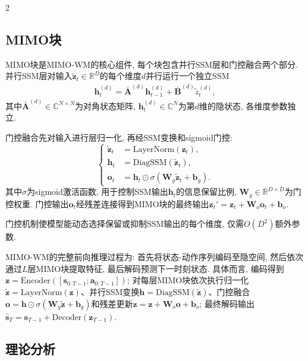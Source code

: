 \begin{multicols}{2}
\subsection{MIMO块}

\begin{Def}
MIMO块是MIMO-WM的核心组件, 每个块包含并行SSM层和门控融合两个部分.
并行SSM层对输入$\tilde{{\bm z}}_t \in \mathbb{R}^D$的每个维度$d$并行运行一个独立SSM
\begin{eqnarray}
{\bm h}_t^{(d)} = \bar{{\bm A}}^{(d)}{\bm h}_{t-1}^{(d)} + \bar{{\bm B}}^{(d)}\tilde{z}_t^{(d)},
\end{eqnarray}
其中$\bar{{\bm A}}^{(d)} \in \mathbb{C}^{N \times N}$为对角状态矩阵,
${\bm h}_t^{(d)} \in \mathbb{C}^N$为第$d$维的隐状态, 各维度参数独立.

门控融合先对输入进行层归一化, 再经SSM变换和sigmoid门控:
\begin{equation}
\left\{\begin{aligned}
\tilde{{\bm z}}_t &= \text{LayerNorm}({\bm z}_t), \\
{\bm h}_t &= \text{DiagSSM}(\tilde{{\bm z}}_t), \\
{\bm o}_t &= {\bm h}_t \odot \sigma({\bm W}_g\tilde{{\bm z}}_t + {\bm b}_g).
\end{aligned}\right.
\end{equation}
其中$\sigma$为sigmoid激活函数, 用于控制SSM输出${\bm h}_t$的信息保留比例, ${\bm W}_g \in \mathbb{R}^{D \times D}$为门控权重. 门控输出${\bm o}_t$经残差连接得到MIMO块的最终输出${\bm z}_t' = {\bm z}_t + {\bm W}_o{\bm o}_t + {\bm b}_o$.
\end{Def}

门控机制使模型能动态选择保留或抑制SSM输出的每个维度,
仅需$O(D^2)$额外参数.

MIMO-WM的完整前向推理过程为: 首先将状态-动作序列编码至隐空间, 然后依次通过$L$层MIMO块提取特征, 最后解码预测下一时刻状态. 具体而言, 编码得到${\bm z} = \text{Encoder}([{\bm s}_{0:T{-}1}; {\bm a}_{0:T{-}1}])$;
对每层MIMO块依次执行归一化$\tilde{{\bm z}} = \text{LayerNorm}({\bm z})$、并行SSM变换${\bm h} = \text{DiagSSM}(\tilde{{\bm z}})$、门控融合${\bm o} = {\bm h} \odot \sigma({\bm W}_g\tilde{{\bm z}} + {\bm b}_g)$和残差更新${\bm z} = {\bm z} + {\bm W}_o{\bm o} + {\bm b}_o$;
最终解码输出$\hat{{\bm s}}_T = {\bm s}_{T{-}1} + \text{Decoder}({\bm z}_{T{-}1})$.

\subsection{理论分析}
    

\end{multicols}
